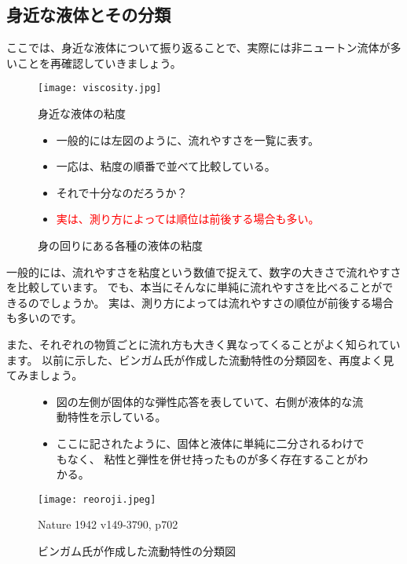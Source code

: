 \documentclass[uplatex,dvipdfmx,a4paper,11pt]{jsreport}
\begin{document}
\subsection{身近な液体とその分類}
ここでは、身近な液体について振り返ることで、実際には非ニュートン流体が多いことを再確認していきましょう。
\begin{figure}[htb]
	\begin{center}
		\begin{minipage}{0.45\textwidth}
			\begin{center}
			\texttt{[image: viscosity.jpg]}
			\end{center}
		\end{minipage}
		\begin{minipage}{0.45\textwidth}
			\begin{itembox}[l]{身近な液体の粘度}
				\begin{itemize}
					\item 一般的には左図のように、流れやすさを一覧に表す。
					\item 一応は、粘度の順番で並べて比較している。
					\item それで十分なのだろうか？
					\item \textcolor{red}{実は、測り方によっては順位は前後する場合も多い。}
				\end{itemize}
			\end{itembox}
		\end{minipage}
		\caption{身の回りにある各種の液体の粘度}
	\end{center}
\end{figure}

一般的には、流れやすさを粘度という数値で捉えて、数字の大きさで流れやすさを比較しています。
でも、本当にそんなに単純に流れやすさを比べることができるのでしょうか。
実は、測り方によっては流れやすさの順位が前後する場合も多いのです。

また、それぞれの物質ごとに流れ方も大きく異なってくることがよく知られています。
以前に示した、ビンガム氏が作成した流動特性の分類図を、再度よく見てみましょう。
\begin{figure}[htb]
	\begin{center}
		\begin{minipage}{0.9\textwidth}
			\begin{itemize}
				\item 図の左側が固体的な弾性応答を表していて、右側が液体的な流動特性を示している。
				\item ここに記されたように、固体と液体に単純に二分されるわけでもなく、
				粘性と弾性を併せ持ったものが多く存在することがわかる。
			\end{itemize}
		\end{minipage}
		\begin{minipage}{0.9\textwidth}
			\begin{center}
			\texttt{[image: reoroji.jpeg]}

			Nature 1942 v149-3790, p702
			\end{center}
		\end{minipage}
		\caption{ビンガム氏が作成した流動特性の分類図}
	\end{center}
\end{figure}
\end{document}
